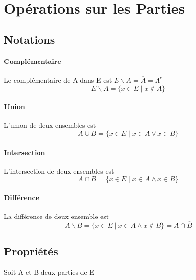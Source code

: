 

\minitoc
	\section{Opérations sur les Parties}
	\subsection{Notations}
		\traitd
		\paragraph{Complémentaire}
			Le complémentaire de A dans E est $E\backslash A=\overline{A} =A^c$
			\[E\backslash A=\{x \in E \mid x \notin A \}\] \vspace*{-0.7cm} \trait ${}$ \vspace*{-1.4cm} \traitd
		\paragraph{Union}
			L'union de deux ensembles est \[A \cup B = \{ x \in E \mid x \in A \vee x \in B\} \] 
			\vspace*{-0.7cm} \trait \newpage \traitd
		\paragraph{Intersection}
			L'intersection de deux ensembles est \[A \cap B = \{ x \in E \mid x \in A \wedge x \in B\} \]
			\vspace*{-0.7cm} \trait ${}$ \vspace*{-1.4cm} \traitd
		\paragraph{Différence}
			La différence de deux ensemble est \[ A \backslash B = \{ x \in E \mid x \in A \wedge x \notin B \} = A \cap \overline{B} \] 
			\vspace*{-0.7cm} \trait
	\subsection{Propriétés}
		Soit A et B deux parties de E
